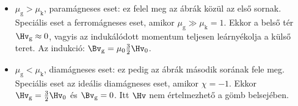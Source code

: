    \begin{itemize}
    \item $\mu_\text{g}>\mu_\text{k}$, paramágneses eset: ez felel meg az ábrák közül az első sornak.
   Speciális eset a ferromágneses eset, amikor $\mu_\text{g}\gg\mu_\text{k}=1$.
   Ekkor a belső tér $\Hv_\text{g}\approx0$, vagyis az indukálódott momentum teljesen leárnyékolja a külső teret.
   Az indukció: $\Bv_\text{g}=\mu_0\frac{3}{2}\Hv_0$.
    \item $\mu_\text{g}<\mu_\text{k}$, diamágneses eset: ez pedig az ábrák második sorának fele meg.
   Speciális eset az ideális diamágneses eset, amikor $\chi=-1$.
   Ekkor $\Hv_\text{g}=\frac{3}{2}\Hv_0$ és $\Bv_\text{g}=0$.
   Itt $\Hv$ nem értelmezhető a gömb belsejében.
   \end{itemize}
